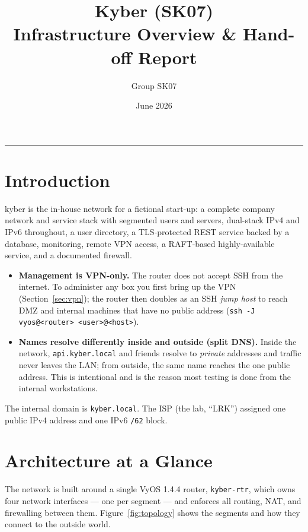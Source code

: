 \documentclass[11pt,a4paper]{article}
\title{\textbf{Kyber (SK07)} \\[2pt] \large Infrastructure Overview \& Hand-off Report}
\author{Group SK07}
\date{June 2026}
\newcommand{\code}[1]{\texttt{#1}}
\begin{document}
\maketitle


\tableofcontents
\bigskip
\hrule

\section{Introduction}

kyber is the in-house network for a fictional start-up: a complete company network and
service stack with segmented users and servers, dual-stack IPv4 and IPv6 throughout, a user directory, a TLS-protected REST service backed by a database, monitoring,
remote VPN access, a RAFT-based highly-available service, and a documented firewall.


\begin{itemize}
  \item \textbf{Management is VPN-only.} The router does not accept SSH from the
        internet. To administer any box you first bring up the VPN
        (Section~\ref{sec:vpn}); the router then doubles as an SSH \emph{jump host} to
        reach DMZ and internal machines that have no public address
        (\code{ssh -J vyos@<router> <user>@<host>}).
  \item \textbf{Names resolve differently inside and outside (split DNS).} Inside the
        network, \code{api.kyber.local} and friends resolve to \emph{private} addresses
        and traffic never leaves the LAN; from outside, the same name reaches the one
        public address. This is intentional and is the reason most testing is done from
        the internal workstations.
\end{itemize}

The internal domain is \code{kyber.local}. The ISP (the lab, ``LRK'') assigned one public
IPv4 address and one IPv6 \code{/62} block.

\section{Architecture at a Glance}
\label{sec:arch}

The network is built around a single VyOS 1.4.4 router, \code{kyber-rtr}, which owns four
network interfaces --- one per segment --- and enforces all routing, NAT, and firewalling
between them. Figure~\ref{fig:topology} shows the segments and how they connect to the
outside world.
\end{document}
